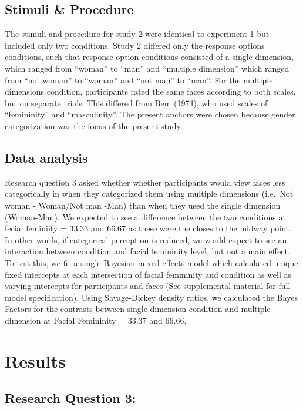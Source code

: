 \documentclass[
  man]{apa7}
\begin{document}
\hypertarget{stimuli-procedure}{%
\subsection{Stimuli \& Procedure}\label{stimuli-procedure}}

The stimuli and procedure for study 2 were identical to experiment 1 but included only two conditions. Study 2 differed only the response options conditions, such that response option conditions consisted of a single dimension, which ranged from ``woman'' to ``man'' and ``multiple dimension'' which ranged from ``not woman'' to ``woman'' and ``not man'' to ``man''. For the multiple dimensions condition, participants rated the same faces according to both scales, but on separate trials. This differed from Bem (1974), who used scales of ``femininity'' and ``masculinity''. The present anchors were chosen because gender categorization was the focus of the present study.

\hypertarget{data-analysis-1}{%
\subsection{Data analysis}\label{data-analysis-1}}

Research question 3 asked whether whether participants would view faces less categorically in when they categorized them using multiple dimensions (i.e.~Not woman - Woman/Not man -Man) than when they used the single dimension (Woman-Man). We expected to see a difference between the two conditions at fecial feminiity = 33.33 and 66.67 as these were the closes to the midway point. In other words, if categorical perception is reduced, we would expect to see an interaction between condition and facial femininity level, but not a main effect. To test this, we fit a single Bayesian mixed-effects model which calculated unique fixed intercepts at each intersection of facial femininity and condition as well as varying intercepts for participants and faces (See supplemental material for full model specification). Using Savage-Dickey density ratios, we calculated the Bayes Factors for the contrasts between single dimension condition and multiple dimension at Facial Femininity = 33.37 and 66.66.

\hypertarget{results-1}{%
\section{Results}\label{results-1}}

\hypertarget{research-question-3}{%
\subsection{Research Question 3:}\label{research-question-3}}
\end{document}
